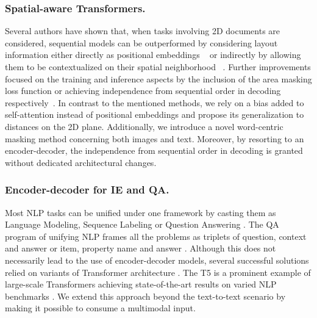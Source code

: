 \documentclass[runningheads]{llncs}
\begin{document}
\subsubsection{Spatial-aware Transformers.} 
Several authors have shown that, when tasks involving 2D documents are considered, sequential models can be outperformed by considering layout information either directly as positional embeddings ~\cite{ho2019axial,garncarek2020lambert,xu2020layoutlm} or indirectly by allowing them to be contextualized on their spatial neighborhood ~\cite{denk2019bertgrid,yin2020tabert,herzig2020tapas}. 
Further improvements focused on the training and inference aspects by the inclusion of the area masking loss function or achieving independence from sequential order in decoding respectively~\cite{hong2021bros,hwang2020spatial}.
In contrast to the mentioned methods, we rely on a bias added to self-attention instead of positional embeddings and propose its generalization to distances on the 2D plane. Additionally, we introduce a novel word-centric masking method concerning both images and text. 
Moreover, by resorting to an encoder-decoder, the independence from sequential order in decoding is granted without dedicated architectural changes.



\subsubsection{Encoder-decoder for IE and QA.} Most NLP tasks can be unified under one framework by casting them as Language Modeling, Sequence Labeling or Question Answering \cite{radford2019language,Keskar2019UnifyingQA}. The QA program of unifying NLP frames all the problems as triplets of question, context and answer \cite{pmlr-v48-kumar16,DBLP:journals/corr/abs-1806-08730,khashabi2020unifiedqa} or item, property name and answer \cite{hewlett-etal-2016-wikireading}. Although this does not necessarily lead to the use of encoder-decoder models, several successful solutions relied on variants of Transformer architecture \cite{transformer,lewis-etal-2020-bart,dwojak-etal-2020-dataset,2020t5}. The T5 is a prominent example of large-scale Transformers achieving state-of-the-art results on varied NLP benchmarks \cite{2020t5}. 
We extend this approach beyond the text-to-text scenario by making it possible to consume a multimodal input.
\end{document}
